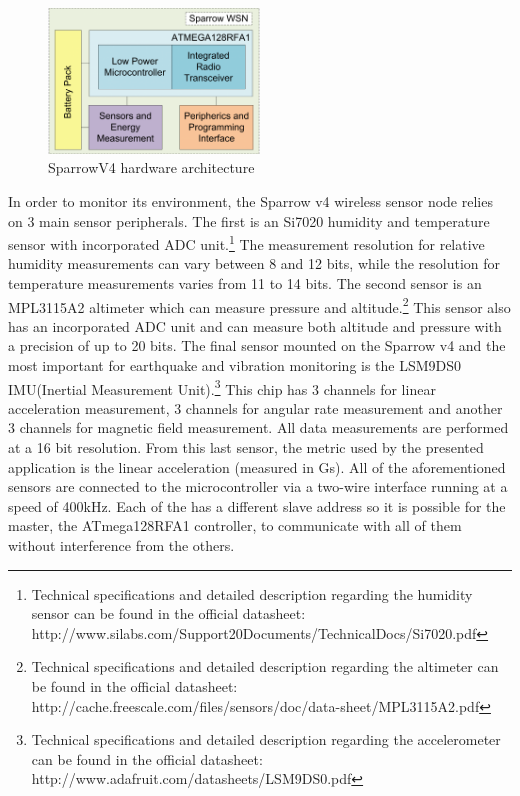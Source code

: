 \begin{figure}[ht] \centering
  \includegraphics[width=0.5\textwidth]{img/sparrow-v4-arch.png}
  \caption{SparrowV4 hardware architecture}
\end{figure}

In order to monitor its environment, the Sparrow v4 wireless sensor node relies on 3 main sensor peripherals. The first is 
an Si7020 humidity and temperature sensor with incorporated ADC unit.\footnote{Technical specifications and detailed description regarding the humidity sensor can be found in the official datasheet: http://www.silabs.com/Support20Documents/TechnicalDocs/Si7020.pdf}
The measurement resolution for relative humidity measurements
can vary between 8 and 12 bits, while the resolution for temperature measurements varies from 11 to 14 bits. The second sensor is 
an MPL3115A2 altimeter which can measure pressure and altitude.\footnote{Technical specifications and detailed description regarding the altimeter can be found in the official datasheet: http://cache.freescale.com/files/sensors/doc/data-sheet/MPL3115A2.pdf} 
This sensor also has an incorporated ADC unit and can measure 
both altitude and pressure with a precision of up to 20 bits. The final sensor mounted on the Sparrow v4 and the most important for 
earthquake and vibration monitoring is the LSM9DS0 IMU(Inertial Measurement Unit).\footnote{Technical specifications and detailed description regarding the accelerometer can be found in the official datasheet: http://www.adafruit.com/datasheets/LSM9DS0.pdf} 
This chip has 3 channels for linear acceleration measurement, 
3 channels for angular rate measurement and another 3 channels for magnetic field measurement. All data measurements are performed at a 
16 bit resolution. From this last sensor, the metric used by the presented application is the linear acceleration (measured in Gs).
All of the aforementioned sensors are connected to the microcontroller via a two-wire interface
running at a speed of 400kHz. Each of the has a different slave address so 
it is possible for the master, the ATmega128RFA1 controller, to communicate with all of them without interference from the others.


